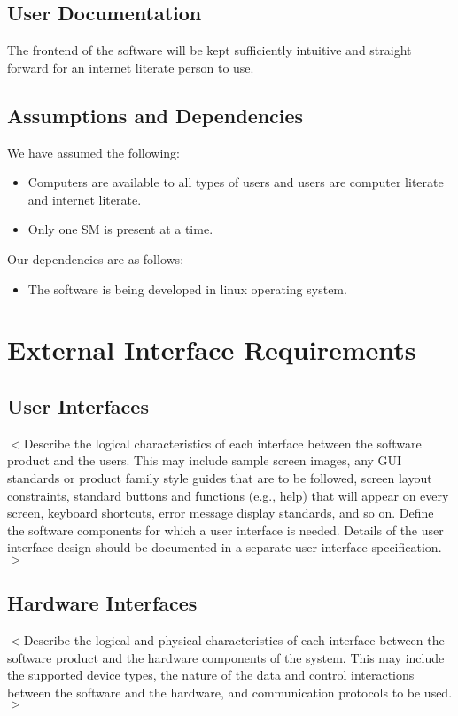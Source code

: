 \documentclass{scrreprt}
\begin{document}
\section{User Documentation}

The frontend of the software will be kept sufficiently intuitive and straight forward for an internet literate person to use.

\section{Assumptions and Dependencies}

We have assumed the following: 
\begin{itemize}
	\item Computers are available to all types of users and users are computer literate and internet literate.
	
	\item Only one SM is present at a time. 
	
\end{itemize}

Our dependencies are as follows:
\begin{itemize}
	\item The software is being developed in linux operating system.
\end{itemize}


\chapter{External Interface Requirements}

\section{User Interfaces}
$<$Describe the logical characteristics of each interface between the software 
product and the users. This may include sample screen images, any GUI standards 
or product family style guides that are to be followed, screen layout 
constraints, standard buttons and functions (e.g., help) that will appear on 
every screen, keyboard shortcuts, error message display standards, and so on.  
Define the software components for which a user interface is needed. Details of 
the user interface design should be documented in a separate user interface 
specification.$>$

\section{Hardware Interfaces}
$<$Describe the logical and physical characteristics of each interface between 
the software product and the hardware components of the system. This may include 
the supported device types, the nature of the data and control interactions 
between the software and the hardware, and communication protocols to be 
used.$>$
\end{document}
